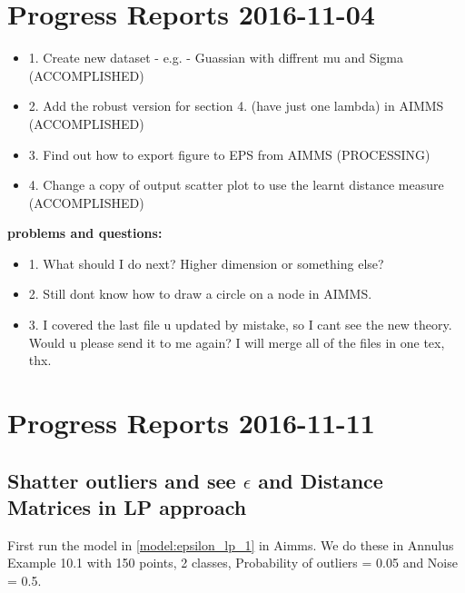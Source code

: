 \documentclass[]{article}
\begin{document}
\newpage
\section{Progress Reports 2016-11-04}




\begin{itemize}
\item 1. Create new dataset - e.g.  - Guassian with diffrent mu and Sigma (ACCOMPLISHED)

\item 2. Add the robust version for section 4. (have just one lambda) in AIMMS (ACCOMPLISHED)

\item 3. Find out how to export figure to EPS from AIMMS (PROCESSING)

\item 4. Change a copy of output scatter plot to use the learnt distance measure (ACCOMPLISHED)


\end{itemize}
{\bf problems and questions:}
\begin{itemize}
\item 1. What should I do next? Higher dimension or something else?

\item 2. Still dont know how to draw a circle on a node in AIMMS.

\item 3. I covered the last file u updated by mistake, so I cant see the new theory. Would u please send it to me again? I will merge all of the files in one tex, thx.


\end{itemize}


\newpage
\section{Progress Reports 2016-11-11}

\subsection{Shatter outliers and see $\epsilon$ and Distance Matrices in LP approach}

First run the model in \eqref{model:epsilon_lp_1} in Aimms. 
We do these in Annulus Example 10.1 with 150 points, 2 classes, Probability of outliers = 0.05 and Noise = 0.5.
\end{document}
